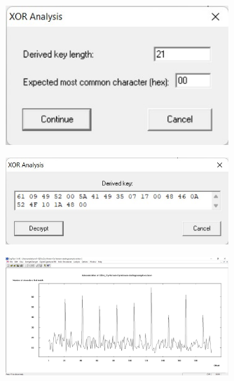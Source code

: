\documentclass{article}
\begin{document}
\begin{figure}[H]
    \centering
    \includegraphics[width=0.75\textwidth]{figures/5cd.jpg}
    \caption
	{}
    \label{fig:fig1}
\end{figure}
\begin{figure}[H]
    \centering
    \includegraphics[width=0.75\textwidth]{figures/5ce.jpg}
    \caption
	{}
    \label{fig:fig1}
\end{figure}
\begin{figure}[H]
    \centering
    \includegraphics[width=0.75\textwidth]{figures/5cf.jpg}
    \caption
	{}
    \label{fig:fig1}
\end{figure}


%


\end{document}
